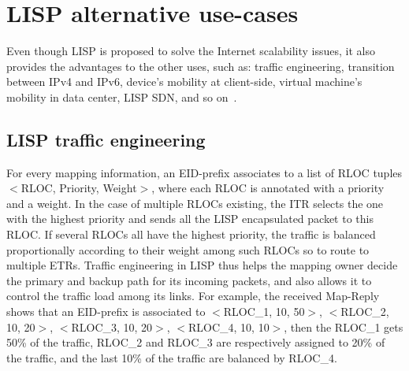 \section{LISP alternative use-cases}
\label{subsec:studies_usecase}
Even though LISP is proposed to solve the Internet scalability issues, it also provides the advantages to the other uses, such as: traffic engineering, transition between IPv4 and IPv6, device's mobility at client-side, virtual machine's mobility in data center, LISP SDN, and so on~\cite{rfc7834}. 

\subsection{LISP traffic engineering}
\label{subsubsec:te}
For every mapping information, an EID-prefix associates to a list of RLOC tuples $<$RLOC, Priority, Weight$>$, where each RLOC is annotated with a priority and a weight. In the case of multiple RLOCs existing, the ITR selects the one with the highest priority and sends all the LISP encapsulated packet to this RLOC. If several RLOCs all have the highest priority, the traffic is balanced proportionally according to their weight among such RLOCs so to route to multiple ETRs. Traffic engineering in LISP thus helps the mapping owner decide the primary and backup path for its incoming packets, and also allows it to control the traffic load among its links. For example, the received Map-Reply shows that an EID-prefix is associated to $<$RLOC\_1, 10, 50$>$, $<$RLOC\_2, 10, 20$>$, $<$RLOC\_3, 10, 20$>$, $<$RLOC\_4, 10, 10$>$, then the RLOC\_1 gets 50\% of the traffic, RLOC\_2 and RLOC\_3 are respectively assigned to 20\% of the traffic, and the last 10\% of the traffic are balanced by RLOC\_4.  %

